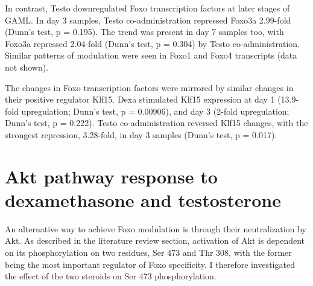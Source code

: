 \documentclass[12pt,english]{report}\usepackage[]{graphicx}\usepackage[]{color}
\begin{document}
In contrast, Testo downregulated Foxo transcription factors at later
stages of GAML. In day 3 samples, Testo co-administration repressed
Foxo3a 2.99-fold
(Dunn's test, p = 0.195).
The trend was present in day 7 samples too, with Foxo3a repressed
2.04-fold
(Dunn's test, p = 0.304)
by Testo co-administration. Similar patterns of modulation were seen
in Foxo1 and Foxo4 transcripts (data not shown).

The changes in Foxo transcription factors were mirrored by similar
changes in their positive regulator Klf15. Dexa stimulated Klf15 expression
at day 1 (13.9-fold
upregulation; Dunn's test, p = 0.00906),
and day 3 (2-fold
upregulation; Dunn's test, p = 0.222).
Testo co-administration reversed Klf15 changes, with the strongest
repression, 3.28-fold,
in day 3 samples (Dunn's test, p = 0.017).


\section{Akt pathway response to dexamethasone and testosterone}

An alternative way to achieve Foxo modulation is through their neutralization
by Akt. As described in the literature review section, activation
of Akt is dependent on its phosphorylation on two residues, Ser 473
and Thr 308, with the former being the most important regulator of
Foxo specificity. I therefore investigated the effect of the two steroids
on Ser 473 phosphorylation.
\end{document}
